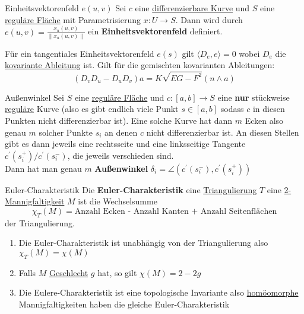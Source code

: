 \begin{titleDef}{Einheitsvektorenfeld $e(u,v)$}
\label{einheitsvekfeld}
Sei $c$ eine \hyperref[kurve]{differenzierbare Kurve} und $S$ eine \hyperref[regFlaeche]{reguläre Fläche} mit Parametrisierung $x:U\to S$.
Dann wird durch $e(u,v)=\frac{x_u(u,v)}{\lVert x_u(u,v)\rVert}$ ein \textbf{Einheitsvektorenfeld} definiert.\par
Für ein tangentiales Einheitsvektorenfeld $e(s)$ gilt $\langle D_e,e\rangle=0$ wobei $D_e$ die \hyperref[kovAbleitung]{kovariante Ableitung} ist. Gilt für die gemischten kovarianten Ableitungen:
$$(D_vD_u-D_uD_v)a=K\sqrt{EG-F^2}(n\wedge a)$$
\end{titleDef}

\begin{titleDef}{Außenwinkel}
\label{aussenwinkel}
Sei $S$ eine \hyperref[regFlaeche]{reguläre Fläche} und $c:[a,b]\to S$ eine \textbf{nur} stückweise \hyperref[regulaer]{reguläre} Kurve (also es gibt endlich viele Punkt $s\in [a,b]$ sodass $c$ in diesen Punkten nicht differenzierbar ist). Eine solche Kurve hat dann $m$ Ecken also genau $m$ solcher Punkte $s_i$ an denen $c$ nicht differenzierbar ist. An diesen Stellen gibt es dann jeweils eine rechtsseite und eine linksseitige Tangente $c^\prime(s_i^+)/c^\prime(s_i^-)$, die jeweils verschieden sind.\\
Dann hat man genau $m$ \textbf{Außenwinkel} $\delta_i=\angle(c^\prime(s_i^-),c^\prime(s_i^+))$
\end{titleDef}

\begin{titleDef}{Euler-Charakteristik}
\label{eulerchar}
Die \textbf{Euler-Charakteristik} eine \hyperref[triangulierung]{Triangulierung} $T$ eine \hyperref[Mannigfaltigkeit]{2-Mannigfaltigkeit} $M$ ist die Wechselsumme
$$\chi_T(M)=\text{Anzahl Ecken - Anzahl Kanten + Anzahl Seitenflächen}$$
der Triangulierung.
\begin{enumerate}[label=(\arabic*)]
	\item Die Euler-Charakteristik ist unabhängig von der Triangulierung also $\chi_T(M)=\chi(M)$
	\item Falls $M$ \hyperref[geschlecht]{Geschlecht} $g$ hat, so gilt $\chi(M)=2-2g$
	\item Die Eulere-Charakteristik ist eine topologische Invariante also \hyperref[homoemorph]{homöomorphe} Mannigfaltigkeiten haben die gleiche Euler-Charakteristik
\end{enumerate}
\end{titleDef}

